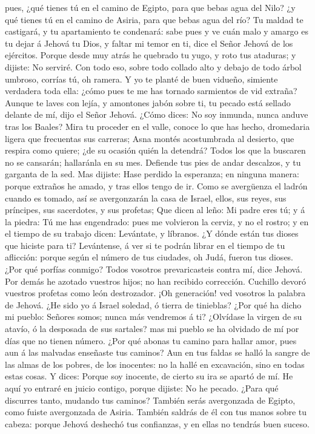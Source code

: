 pues, ¿qué tienes tú en el camino de Egipto, para que bebas agua del
Nilo? ¿y qué tienes tú en el camino de Asiria, para que bebas agua del
río?  Tu maldad te castigará, y tu apartamiento te
condenará: sabe pues y ve cuán malo y amargo es tu dejar á Jehová tu
Dios, y faltar mi temor en ti, dice el Señor Jehová de los ejércitos.
 Porque desde muy atrás he quebrado tu yugo, y roto tus
ataduras; y dijiste: No serviré. Con todo eso, sobre todo collado alto y
debajo de todo árbol umbroso, corrías tú, oh ramera.  Y yo
te planté de buen vidueño, simiente verdadera toda ella: ¿cómo pues te
me has tornado sarmientos de vid extraña?  Aunque te laves
con lejía, y amontones jabón sobre ti, tu pecado está sellado delante de
mí, dijo el Señor Jehová.  ¿Cómo dices: No soy inmunda,
nunca anduve tras los Baales? Mira tu proceder en el valle, conoce lo
que has hecho, dromedaria ligera que frecuentas sus carreras;
 Asna montés acostumbrada al desierto, que respira como
quiere; ¿de su ocasión quién la detendrá? Todos los que la buscaren no
se cansarán; hallaránla en su mes.  Defiende tus pies de
andar descalzos, y tu garganta de la sed. Mas dijiste: Hase perdido la
esperanza; en ninguna manera: porque extraños he amado, y tras ellos
tengo de ir.  Como se avergüenza el ladrón cuando es
tomado, así se avergonzarán la casa de Israel, ellos, sus reyes, sus
príncipes, sus sacerdotes, y sus profetas;  Que dicen al
leño: Mi padre eres tú; y á la piedra: Tú me has engendrado: pues me
volvieron la cerviz, y no el rostro; y en el tiempo de su trabajo dicen:
Levántate, y líbranos.  ¿Y dónde están tus dioses que
hiciste para ti? Levántense, á ver si te podrán librar en el tiempo de
tu aflicción: porque según el número de tus ciudades, oh Judá, fueron
tus dioses.  ¿Por qué porfías conmigo? Todos vosotros
prevaricasteis contra mí, dice Jehová.  Por demás he
azotado vuestros hijos; no han recibido corrección. Cuchillo devoró
vuestros profetas como león destrozador.  ¡Oh generación!
ved vosotros la palabra de Jehová. ¿He sido yo á Israel soledad, ó
tierra de tinieblas? ¿Por qué ha dicho mi pueblo: Señores somos; nunca
más vendremos á ti?  ¿Olvídase la virgen de su atavío, ó la
desposada de sus sartales? mas mi pueblo se ha olvidado de mí por días
que no tienen número.  ¿Por qué abonas tu camino para
hallar amor, pues aun á las malvadas enseñaste tus caminos?
 Aun en tus faldas se halló la sangre de las almas de los
pobres, de los inocentes: no la hallé en excavación, sino en todas estas
cosas.  Y dices: Porque soy inocente, de cierto su ira se
apartó de mí. He aquí yo entraré en juicio contigo, porque dijiste: No
he pecado.  ¿Para qué discurres tanto, mudando tus caminos?
También serás avergonzada de Egipto, como fuiste avergonzada de Asiria.
 También saldrás de él con tus manos sobre tu cabeza:
porque Jehová deshechó tus confianzas, y en ellas no tendrás buen
suceso.

